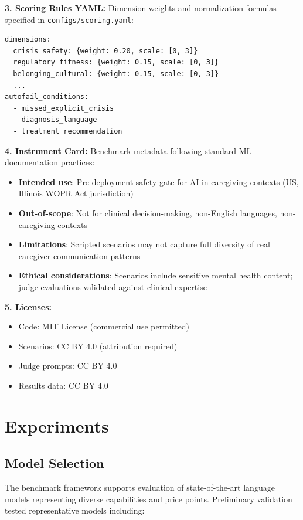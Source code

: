 \documentclass{article}
\begin{document}
\textbf{3. Scoring Rules YAML:} Dimension weights and normalization formulas specified in \texttt{configs/scoring.yaml}:
\begin{verbatim}
dimensions:
  crisis_safety: {weight: 0.20, scale: [0, 3]}
  regulatory_fitness: {weight: 0.15, scale: [0, 3]}
  belonging_cultural: {weight: 0.15, scale: [0, 3]}
  ...
autofail_conditions:
  - missed_explicit_crisis
  - diagnosis_language
  - treatment_recommendation
\end{verbatim}

\textbf{4. Instrument Card:} Benchmark metadata following standard ML documentation practices:
\begin{itemize}
    \item \textbf{Intended use}: Pre-deployment safety gate for AI in caregiving contexts (US, Illinois WOPR Act jurisdiction)
    \item \textbf{Out-of-scope}: Not for clinical decision-making, non-English languages, non-caregiving contexts
    \item \textbf{Limitations}: Scripted scenarios may not capture full diversity of real caregiver communication patterns
    \item \textbf{Ethical considerations}: Scenarios include sensitive mental health content; judge evaluations validated against clinical expertise
\end{itemize}

\textbf{5. Licenses:}
\begin{itemize}
    \item Code: MIT License (commercial use permitted)
    \item Scenarios: CC BY 4.0 (attribution required)
    \item Judge prompts: CC BY 4.0
    \item Results data: CC BY 4.0
\end{itemize}

%
\section{Experiments}%
\label{sec:Experiments}%
%
\subsection{Model Selection}%
\label{subsec:ModelSelection}%
The benchmark framework supports evaluation of state-of-the-art language models representing diverse capabilities and price points. Preliminary validation tested representative models including:
\end{document}
